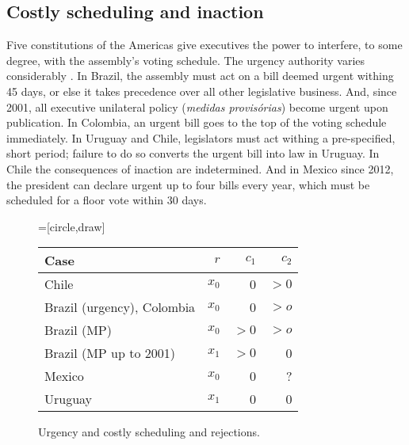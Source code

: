 \documentclass[letter,12pt]{article}
\begin{document}
\subsection{Costly scheduling and inaction}

Five constitutions of the Americas give executives the power to interfere, to some degree, with the assembly's voting schedule. The urgency authority varies considerably \citep[][:437]{morgenstern.2002b}. In Brazil, the assembly must act on a bill deemed urgent withing 45 days, or else it takes precedence over all other legislative business. And, since 2001, all executive unilateral policy (\emph{medidas provis\'orias}) become urgent upon publication. In Colombia, an urgent bill goes to the top of the voting schedule immediately. In Uruguay and Chile, legislators must act withing a pre-specified, short period; failure to do so converts the urgent bill into law in Uruguay. In Chile the consequences of inaction are indetermined. And in Mexico since 2012, the president can declare urgent up to four bills every year, which must be scheduled for a floor vote within 30 days. 

\begin{figure}
  \centering
    =[circle,draw]
      \begin{tabular}{lrrr}
  Case                       & $r$   & $c_1$ & $c_2$    \\ \hline
  Chile                      & $x_0$ & 0     & $>0$     \\
  Brazil (urgency), Colombia & $x_0$ & 0     & $> o$ \\
  Brazil (MP)                & $x_0$ & $>0$  & $> o$ \\
  Brazil (MP up to 2001)     & $x_1$ & $>0$  & 0        \\
  Mexico                     & $x_0$ & 0     & ?        \\
  Uruguay                    & $x_1$ & 0     & 0        \\
  \end{tabular}
  \caption{Urgency and costly scheduling and rejections. }\label{f:costly}
\end{figure}
\end{document}
